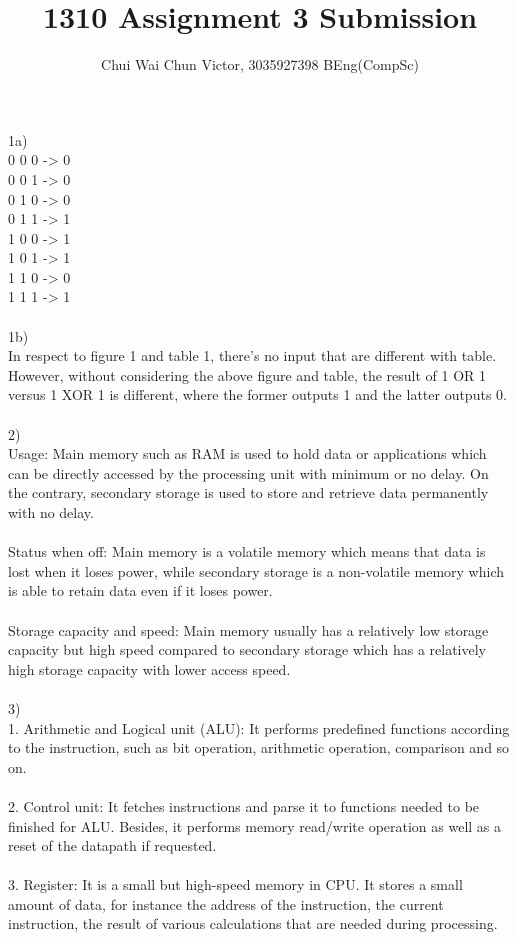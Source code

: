 \documentclass{article}
\title{1310 Assignment 3 Submission}
\author{Chui Wai Chun Victor, 3035927398 BEng(CompSc)}
\begin{document}
\maketitle
\noindent
1a) \\
0 0 0 -> 0\\
0 0 1 -> 0\\
0 1 0 -> 0\\
0 1 1 -> 1\\
1 0 0 -> 1\\
1 0 1 -> 1\\
1 1 0 -> 0\\
1 1 1 -> 1\\\\
1b)\\
In respect to figure 1 and table 1, there's no input that are different with table. However, without considering the above figure and table, the result of 1 OR 1 versus 1 XOR 1 is different, where the former outputs 1 and the latter outputs 0.\\
\\
2)\\
Usage: Main memory such as RAM is used to hold data or applications which can be directly accessed by the processing unit with minimum or no delay. On the contrary, secondary storage is used to store and retrieve data permanently with no delay.\\\\
Status when off: Main memory is a volatile memory which means that data is lost when it loses power, while secondary storage is a non-volatile memory which is able to retain data even if it loses power.\\\\
Storage capacity and speed: Main memory usually has a relatively low storage capacity but high speed compared to secondary storage which has a relatively high storage capacity with lower access speed.
\\
\\
3)\\
1. Arithmetic and Logical unit (ALU): It performs predefined functions according to the instruction, such as bit operation, arithmetic operation, comparison and so on.\\\\
2. Control unit: It fetches instructions and parse it to functions needed to be finished for ALU. Besides, it performs memory read/write operation as well as a reset of the datapath if requested.\\\\
3. Register: It is a small but high-speed memory in CPU. It stores a small amount of data, for instance the address of the instruction, the current instruction, the result of various calculations that are needed during processing.\\\\
\end{document}
